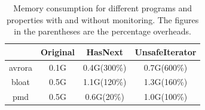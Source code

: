 \begin{table}[t]
\centering
\small
\begin{tabular}{|c|c|c|c|}
\hline
 {} & Original & HasNext & UnsafeIterator\\
 \hline
avrora            & 0.1G      & 0.4G(300\%)       & 0.7G(600\%)           \\ 
\hline
bloat             & 0.5G      & 1.1G(120\%)    & 1.3G(160\%)              \\ 
\hline
pmd               & 0.5G      & 0.6G(20\%)     & 1.0G(100\%)             \\ 
\hline
\end{tabular}
\caption{Memory consumption for different programs and properties with and 
without monitoring. The figures in the parentheses are the percentage 
overheads. %
}
\end{table}
\label{table:consumedmemory}

